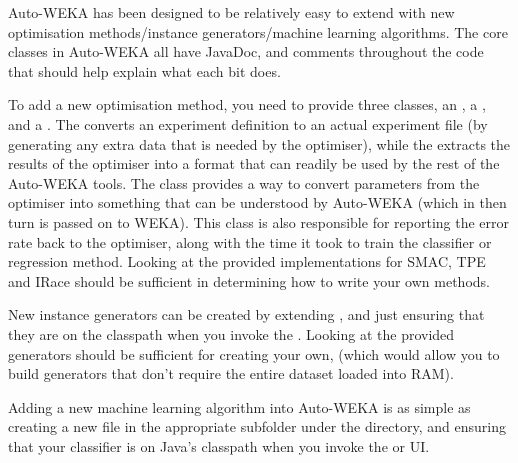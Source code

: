 Auto-WEKA has been designed to be relatively easy to extend with new optimisation methods/instance generators/machine learning algorithms. The core classes in Auto-WEKA all have JavaDoc, and comments throughout the code that should help explain what each bit does.

To add a new optimisation method, you need to provide three classes, an , a , and a . The  converts an experiment definition to an actual experiment file (by generating any extra data that is needed by the optimiser), while the  extracts the results of the optimiser into a format that can readily be used by the rest of the Auto-WEKA tools. The  class provides a way to convert parameters from the optimiser into something that can be understood by Auto-WEKA (which in then turn is passed on to WEKA). This class is also responsible for reporting the error rate back to the optimiser, along with the time it took to train the classifier or regression method. Looking at the provided implementations for SMAC, TPE and IRace should be sufficient in determining how to write your own methods.

New instance generators can be created by extending , and just ensuring that they are on the classpath when you invoke the . Looking at the provided generators should be sufficient for creating your own, (which would allow you to build generators that don't require the entire dataset loaded into RAM).

Adding a new machine learning algorithm into Auto-WEKA is as simple as creating a new  file in the appropriate subfolder under the  directory, and ensuring that your classifier is on Java's classpath when you invoke the  or UI.
